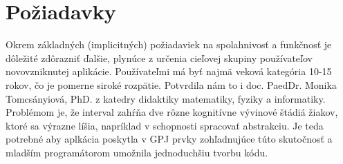 \section{Požiadavky}
Okrem základných (implicitných) požiadaviek na spolahnivosť a funkčnosť je dôležité zdôrazniť ďalšie, plynúce z určenia cieľovej skupiny používateľov novovzniknutej aplikácie. Používateľmi má byť najmä veková kategória 10-15 rokov, čo je pomerne siroké rozpätie. Potvrdila nám to i doc. PaedDr. Monika Tomcsányiová, PhD. z katedry didaktiky matematiky, fyziky a informatiky. Problémom je, že interval zahŕňa dve rôzne kognitívne vývinové štádiá žiakov, ktoré sa výrazne líšia, napríklad v schopnosti spracovať abstrakciu. Je teda potrebné aby aplkácia poskytla v GPJ prvky zohľadnujúce túto skutočnosť a mladším programátorom umožnila jednoduchšiu tvorbu kódu.